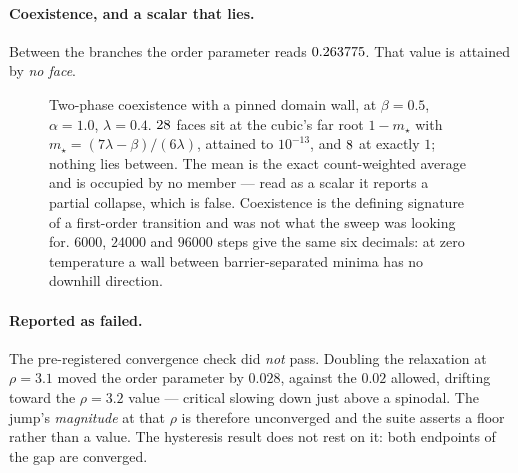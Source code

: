 \documentclass[11pt]{article}
\theoremstyle{remark}
\begin{document}
\paragraph{Coexistence, and a scalar that lies.} Between the branches the order
parameter reads $0.263775$. That value is attained by \emph{no face}.

\begin{figure}[ht]\centering
{}
\caption{Two-phase coexistence with a pinned domain wall, at $\beta=0.5$, $\alpha=1.0$,
$\lambda=0.4$. $28$ faces sit at the cubic's far root
$1-m_\star$ with $m_\star=(7\lambda-\beta)/(6\lambda)$, attained to $10^{-13}$, and
$8$ at exactly $1$; nothing lies between. The mean is the exact count-weighted
average and is occupied by no member --- read as a scalar it reports a partial collapse,
which is false. Coexistence is the defining signature of a first-order transition and
was not what the sweep was looking for. $6000$, $24000$ and $96000$ steps give the same
six decimals: at zero temperature a wall between barrier-separated minima has no
downhill direction.}
\label{fig:coex}
\end{figure}

\paragraph{Reported as failed.} The pre-registered convergence check did \emph{not}
pass. Doubling the relaxation at $\rho=3.1$ moved the order parameter by $0.028$,
against the $0.02$ allowed, drifting toward the $\rho=3.2$ value --- critical slowing
down just above a spinodal. The jump's \emph{magnitude} at that $\rho$ is therefore
unconverged and the suite asserts a floor rather than a value. The hysteresis result
does not rest on it: both endpoints of the gap are converged.
\end{document}
